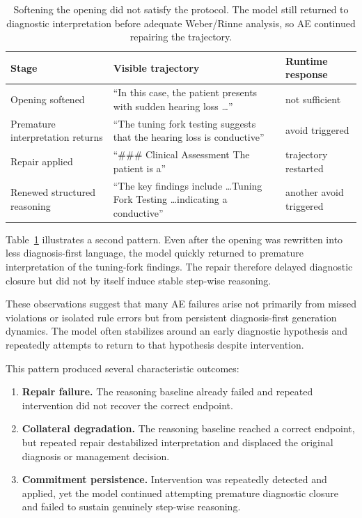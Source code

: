 \documentclass[twocolumn]{article}
\begin{document}
\begin{table}[t]
\centering
\small
\begin{tabularx}{\columnwidth}{>{\raggedright\arraybackslash}p{}X>{\raggedright\arraybackslash}p{}}
\toprule
Stage & Visible trajectory & Runtime response \\
\midrule
Opening softened &
``In this case, the patient presents with sudden hearing loss \ldots'' &
not sufficient \\
Premature interpretation returns &
``The tuning fork testing suggests that the hearing loss is conductive'' &
avoid triggered \\
Repair applied &
``\#\#\# Clinical Assessment The patient is a'' &
trajectory restarted \\
Renewed structured reasoning &
``The key findings include \ldots Tuning Fork Testing \ldots indicating a conductive'' &
another avoid triggered \\
\bottomrule
\end{tabularx}
\caption{Softening the opening did not satisfy the protocol. The model still
returned to diagnostic interpretation before adequate Weber/Rinne analysis, so
AE continued repairing the trajectory.}\label{tab:repair-persistence}
\end{table}

Table~\ref{tab:repair-persistence} illustrates a second pattern. Even after the
opening was rewritten into less diagnosis-first language, the model quickly
returned to premature interpretation of the tuning-fork findings. The repair
therefore delayed diagnostic closure but did not by itself induce stable
step-wise reasoning.

These observations suggest that many AE failures arise not primarily from missed
violations or isolated rule errors but from persistent diagnosis-first
generation dynamics. The model often stabilizes around an early diagnostic
hypothesis and repeatedly attempts to return to that hypothesis despite
intervention.

This pattern produced several characteristic outcomes:

\begin{enumerate}[leftmargin=*,nosep]
\item \textbf{Repair failure.}
The reasoning baseline already failed and repeated intervention did not recover
the correct endpoint.

\item \textbf{Collateral degradation.}
The reasoning baseline reached a correct endpoint, but repeated repair
destabilized interpretation and displaced the original diagnosis or management
decision.

\item \textbf{Commitment persistence.}
Intervention was repeatedly detected and applied, yet the model continued
attempting premature diagnostic closure and failed to sustain genuinely
step-wise reasoning.
\end{enumerate}
\end{document}
